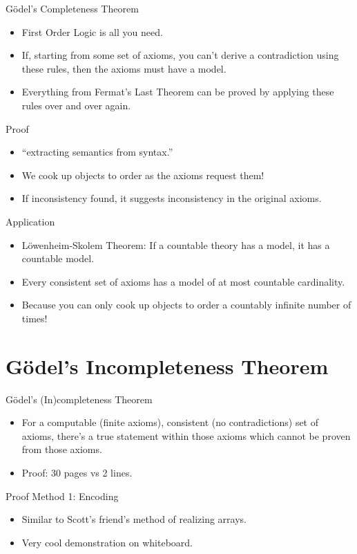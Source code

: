 \documentclass[
    11pt, %
    aspectratio=169, %
]{beamer}
\begin{document}
\begin{frame}{Gödel's Completeness Theorem}
\begin{itemize}
    \item First Order Logic is all you need.
    \item If, starting from some set of axioms, you can’t derive a contradiction using these rules, then the axioms must have a model.
    \item Everything from Fermat's Last Theorem can be proved by applying these rules over and over again.
    
\end{itemize}
    
\end{frame}
\begin{frame}{Proof}
    \begin{itemize}
        \item “extracting semantics from syntax.”
        \item We cook up objects to order as the axioms request them!
        \item If inconsistency found, it suggests inconsistency in the original axioms.
    \end{itemize}
\end{frame}
\begin{frame}{Application}
    \begin{itemize}
        \item Löwenheim-Skolem Theorem: If a countable theory has a model, it has a countable model.
        \item Every consistent set of axioms has a model of at most countable cardinality.
        \item Because you can only cook up objects to order a countably infinite number of times!
    \end{itemize}
\end{frame}


\section{Gödel's Incompleteness Theorem}
\begin{frame}{Gödel's (In)completeness Theorem}
\begin{itemize}
    \item For a computable (finite axioms), consistent (no contradictions) set of axioms, there's a true statement within those axioms which cannot be proven from those axioms.
    \item Proof: 30 pages vs 2 lines.
\end{itemize}
    
\end{frame}
\begin{frame}{Proof Method 1: Encoding}
\begin{itemize}
    \item Similar to Scott's friend's method of realizing arrays.
    \item Very cool demonstration on whiteboard.
\end{itemize}
    
\end{frame}
\end{document}
